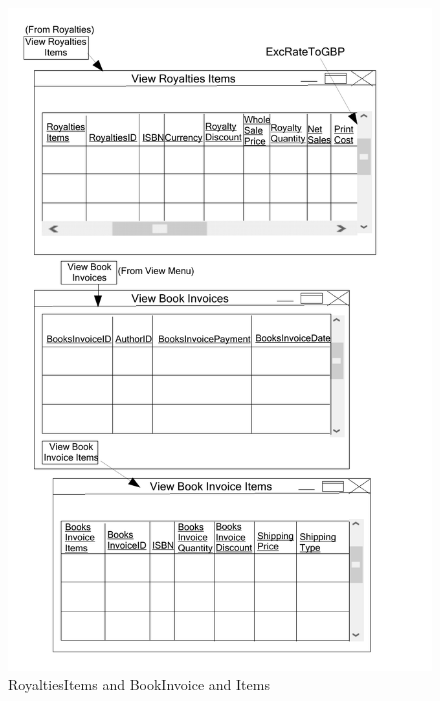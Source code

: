 \begin{figure}[H]
    \caption{RoyaltiesItems and BookInvoice and Items} \label{RoyaltiesItems_and_BookInvoice_and_Items.pdf}
    \includegraphics[width=\textwidth]{./Design/UserInterfaceDesign/RoyaltiesItems_and_BookInvoice_and_Items.pdf}
\end{figure}

